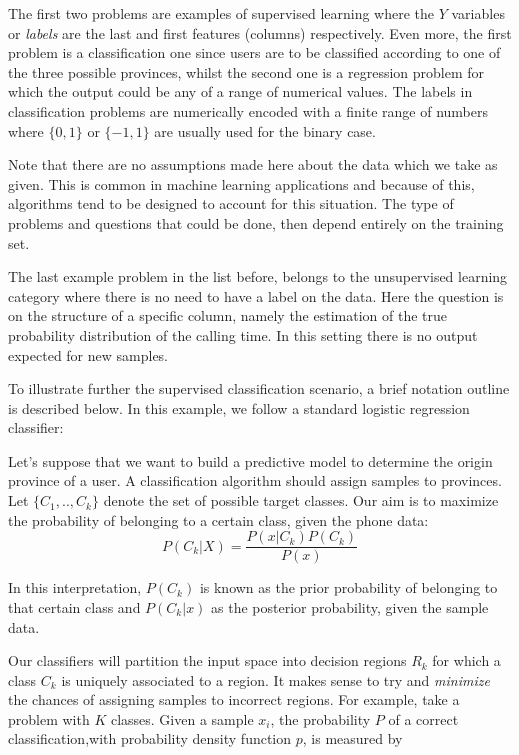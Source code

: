 The first two problems are examples of supervised learning where the $Y$ variables or \textit{labels} are the last and first features (columns) respectively. Even more, the first problem is a classification one since users are to be classified according to one of the three possible provinces, whilst the second one is a regression problem for which the output could be any of a range of numerical values. The labels in classification problems are numerically encoded with a finite range of numbers where $\{0,1\}$ or $\{-1,1\}$ are usually used for the binary case.

Note that there are no assumptions made here about the data which we take as given. %
This is common in machine learning applications and because of this, algorithms tend to be designed to account for this situation. The type of problems and questions that could be done, then depend entirely on the training set.

The last example problem in the list before, belongs to the unsupervised learning category where there is no need to have a label on the data. Here the question is on the structure of a specific column, namely the estimation of the true probability distribution of the calling time. In this setting there is no output expected for new samples.

To illustrate further the supervised classification scenario, a brief notation outline is described below. In this example, we follow a standard logistic regression classifier:


Let's suppose that we want to build a predictive model to determine the origin province of a user. A classification algorithm should assign samples to provinces. Let $\{C_1,..,C_k\}$ denote the set of possible target classes. Our aim is to maximize the probability of belonging to a certain class, given the phone data:
\begin{equation}
P(C_k| X) = \frac{P(x|C_k)P(C_k)}{P(x)} 
\end{equation}

In this interpretation, $P(C_k)$ is known as the prior probability of belonging to that certain class and $P(C_k|x)$ as the posterior probability, given the sample data.

Our classifiers will partition the input space into decision regions $R_k$ for which a class $C_k$ is uniquely associated to a region. It makes sense to try and \textit{minimize} the chances of assigning samples to incorrect regions. For example, take a problem with $K$ classes. Given a sample $x_i$, the probability $P$ of a correct classification,with probability density function $p$, is measured by

